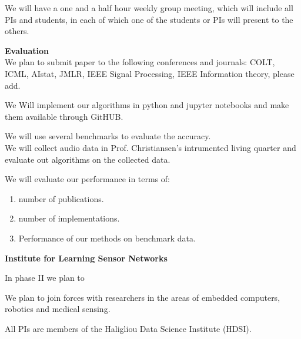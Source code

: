\documentclass{article}
\begin{document}
We will have a one and a half hour weekly group meeting, which will
include all PIs and students, in each of which one of the students or
PIs will present to the others.

{\bf Evaluation}\\
We plan to submit paper to the following conferences and journals:
COLT, ICML, AIstat, JMLR, IEEE Signal Processing, IEEE Information
theory, please add.

We Will implement our algorithms in python and jupyter notebooks and
make them available through GitHUB.

We will use several benchmarks to evaluate the accuracy.
\\
We will collect audio data in Prof. Christiansen's intrumented living
quarter and evaluate out algorithms on the collected data.

We will evaluate our performance in terms of:
\begin{enumerate}
\item number of publications.
\item number of implementations.
\item Performance of our methods on benchmark data.
\end{enumerate}

{\bf Institute for Learning Sensor Networks}\\

In phase II we plan to 

We plan to join forces with researchers in the areas of embedded
computers, robotics and medical sensing.

All PIs are members of the Haligliou Data Science Institute (HDSI).
\end{document}
